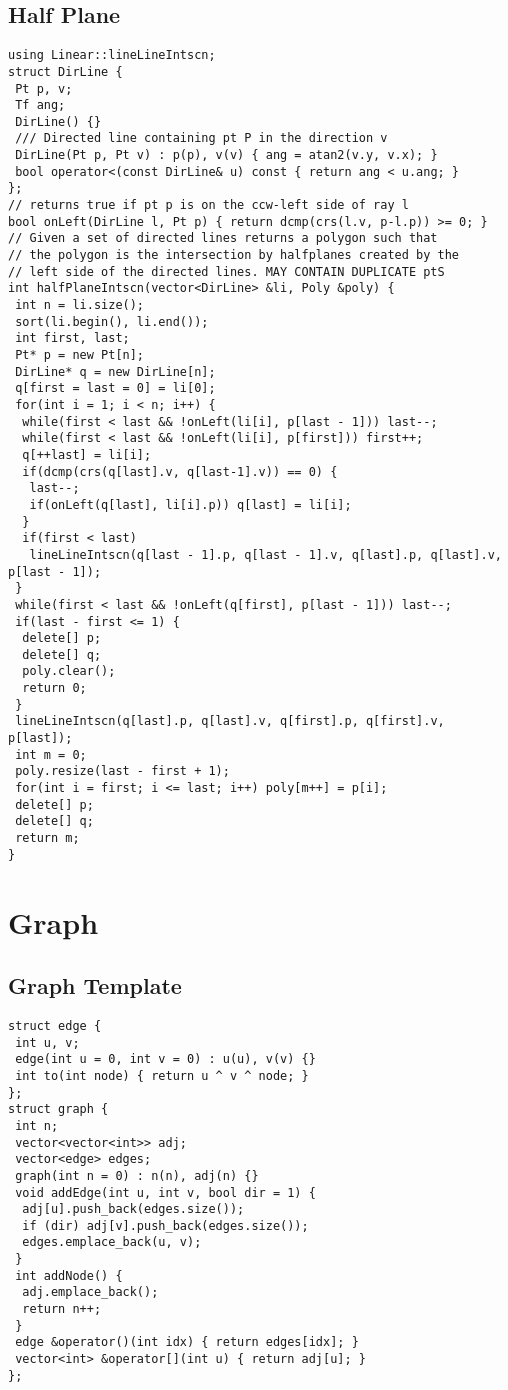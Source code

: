 \documentclass[a4paper,11pt,oneside]{article}
\begin{document}
\begin{multicols*}{\COLS}
\subsection{Half Plane}
\begin{lstlisting}
using Linear::lineLineIntscn;
struct DirLine {
 Pt p, v;
 Tf ang;
 DirLine() {}
 /// Directed line containing pt P in the direction v
 DirLine(Pt p, Pt v) : p(p), v(v) { ang = atan2(v.y, v.x); }
 bool operator<(const DirLine& u) const { return ang < u.ang; }
};
// returns true if pt p is on the ccw-left side of ray l
bool onLeft(DirLine l, Pt p) { return dcmp(crs(l.v, p-l.p)) >= 0; }
// Given a set of directed lines returns a polygon such that
// the polygon is the intersection by halfplanes created by the
// left side of the directed lines. MAY CONTAIN DUPLICATE ptS
int halfPlaneIntscn(vector<DirLine> &li, Poly &poly) {
 int n = li.size();
 sort(li.begin(), li.end());
 int first, last;
 Pt* p = new Pt[n];
 DirLine* q = new DirLine[n];
 q[first = last = 0] = li[0];
 for(int i = 1; i < n; i++) {
  while(first < last && !onLeft(li[i], p[last - 1])) last--;
  while(first < last && !onLeft(li[i], p[first])) first++;
  q[++last] = li[i];
  if(dcmp(crs(q[last].v, q[last-1].v)) == 0) {
   last--;
   if(onLeft(q[last], li[i].p)) q[last] = li[i];
  }
  if(first < last)
   lineLineIntscn(q[last - 1].p, q[last - 1].v, q[last].p, q[last].v, p[last - 1]);
 }
 while(first < last && !onLeft(q[first], p[last - 1])) last--;
 if(last - first <= 1) {
  delete[] p;
  delete[] q;
  poly.clear();
  return 0;
 }
 lineLineIntscn(q[last].p, q[last].v, q[first].p, q[first].v, p[last]);
 int m = 0;
 poly.resize(last - first + 1);
 for(int i = first; i <= last; i++) poly[m++] = p[i];
 delete[] p;
 delete[] q;
 return m;
}
\end{lstlisting}
\section{Graph}
\subsection{Graph Template}
\begin{lstlisting}
struct edge {
 int u, v;
 edge(int u = 0, int v = 0) : u(u), v(v) {}
 int to(int node) { return u ^ v ^ node; }
};
struct graph {
 int n;
 vector<vector<int>> adj;
 vector<edge> edges;
 graph(int n = 0) : n(n), adj(n) {}
 void addEdge(int u, int v, bool dir = 1) {
  adj[u].push_back(edges.size());
  if (dir) adj[v].push_back(edges.size());
  edges.emplace_back(u, v);
 }
 int addNode() {
  adj.emplace_back();
  return n++;
 }
 edge &operator()(int idx) { return edges[idx]; }
 vector<int> &operator[](int u) { return adj[u]; }
};
\end{lstlisting}

\end{multicols*}
\end{document}
